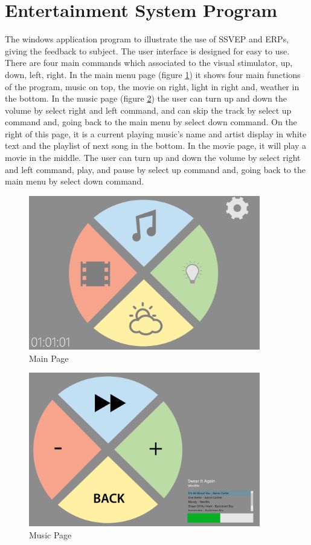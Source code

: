 \section{Entertainment System Program}
\hspace{1.5cm}The windows application program to illustrate the use of SSVEP and ERPs, giving the feedback to subject. The user interface is designed for easy to use. There are four main commands which associated to the visual stimulator, up, down, left, right. In the main menu page (figure \ref{fig:main}) it shows four main functions of the program, music on top, the movie on right, light in right and, weather in the bottom. In the music page (figure \ref{fig:music}) the user can turn up and down the volume by select right and left command, and can skip the track by select up command and, going back to the main menu by select down command. On the right of this page, it is a current playing music's name and artist display in white text and the playlist of next song in the bottom. In the movie page, it will play a movie in the middle. The user can turn up and down the volume by select right and left command, play, and pause by select up command and, going back to the main menu by select down command. 



\begin{figure}[H]
	\centering
	\includegraphics[width=0.9\textwidth]{chapter6/pagemain.png}
	\caption{Main Page}
	\label{fig:main}
\end{figure}
\begin{figure}[H]
		\centering
	\includegraphics[width=0.9\textwidth]{chapter6/pagemusic.png}
	\caption{Music Page}
	\label{fig:music}
\end{figure}

